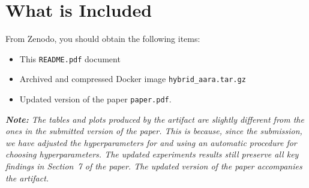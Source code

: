 
\section{What is Included}

From Zenodo, you should obtain the following items:
\begin{itemize}
  \item This \texttt{README.pdf} document
  \item Archived and compressed Docker image \texttt{hybrid\_aara.tar.gz}
  \item Updated version of the paper \texttt{paper.pdf}.
\end{itemize}

\emph{\textbf{Note:} The tables and plots produced by the artifact are
  slightly different from the ones in the submitted version of the
  paper.
%
  This is because, since the submission, we have adjusted the
  hyperparameters for \BayesWC{} and \BayesPC{} using an automatic
  procedure for choosing hyperparameters.
%
  The updated experiments results still preserve all key findings in
  Section~7 of the paper.
%
  The updated version of the paper accompanies the artifact.}


